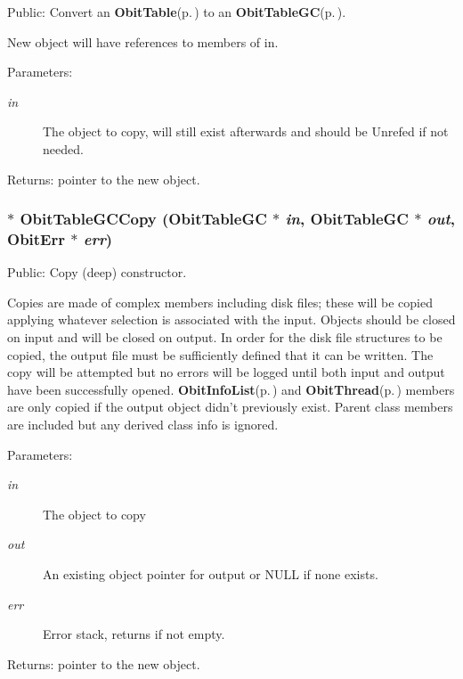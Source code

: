 Public: Convert an {\bf Obit\-Table}{\rm (p.\,\pageref{structObitTable})} to an {\bf Obit\-Table\-GC}{\rm (p.\,\pageref{structObitTableGC})}. 

New object will have references to members of in. \begin{Desc}
\item[Parameters:]
\begin{description}
\item[{\em in}]The object to copy, will still exist afterwards and should be Unrefed if not needed. \end{description}
\end{Desc}
\begin{Desc}
\item[Returns:]pointer to the new object. \end{Desc}
\subsubsection{$\ast$ Obit\-Table\-GCCopy ({\bf Obit\-Table\-GC} $\ast$ {\em in}, {\bf Obit\-Table\-GC} $\ast$ {\em out}, {\bf Obit\-Err} $\ast$ {\em err})}\label{ObitTableGC_8h_a14}


Public: Copy (deep) constructor. 

Copies are made of complex members including disk files; these will be copied applying whatever selection is associated with the input. Objects should be closed on input and will be closed on output. In order for the disk file structures to be copied, the output file must be sufficiently defined that it can be written. The copy will be attempted but no errors will be logged until both input and output have been successfully opened. {\bf Obit\-Info\-List}{\rm (p.\,\pageref{structObitInfoList})} and {\bf Obit\-Thread}{\rm (p.\,\pageref{structObitThread})} members are only copied if the output object didn't previously exist. Parent class members are included but any derived class info is ignored. \begin{Desc}
\item[Parameters:]
\begin{description}
\item[{\em in}]The object to copy \item[{\em out}]An existing object pointer for output or NULL if none exists. \item[{\em err}]Error stack, returns if not empty. \end{description}
\end{Desc}
\begin{Desc}
\item[Returns:]pointer to the new object. \end{Desc}
